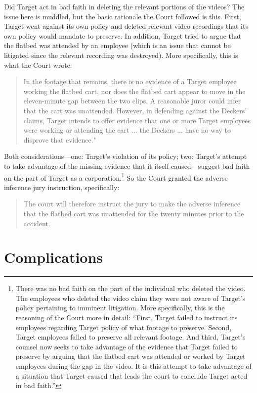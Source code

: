 \documentclass[
  10pt,
  dvipsnames,enabledeprecatedfontcommands]{scrartcl}
\begin{document}
Did Target act in bad faith in deleting the relevant portions of the
videos? The issue here is muddled, but the basic rationale the Court
followed is this. First, Target went against its own policy and deleted
relevant video recordings that its own policy would mandate to preserve.
In addition, Target tried to argue that the flatbed was attended by an
employee (which is an issue that cannot be litigated since the relevant
recording was destroyed). More specifically, this is what the Court
wrote:

\begin{quote}
In the footage that remains, there is no evidence of a Target employee working the flatbed cart, nor does the flatbed cart appear to move in the eleven-minute gap between the two clips. A reasonable juror could infer that the cart was unattended. However, in defending against the Deckers’ claims, Target intends to offer evidence that one or more Target employees were working or attending the cart ... the Deckers ... have no way to disprove that evidence."
\end{quote}

\noindent Both considerations---one: Target's violation of its policy;
two: Target's attempt to take advantage of the missing evidence that it
itself caused---suggest bad faith on the part of Target as a
corporation.\footnote{There was no bad faith on the part of the
  individual who deleted the video. The employees who deleted the video
  claim they were not aware of Target's policy pertaining to imminent
  litigation. More specifically, this is the reasoning of the Court more
  in detail: ``First, Target failed to instruct its employees regarding
  Target policy of what footage to preserve. Second, Target employees
  failed to preserve all relevant footage. And third, Target's counsel
  now seeks to take advantage of the evidence that Target failed to
  preserve by arguing that the flatbed cart was attended or worked by
  Target employees during the gap in the video. It is this attempt to
  take advantage of a situation that Target caused that leads the court
  to conclude Target acted in bad faith.''} So the Court granted the
adverse inference jury instruction, specifically:

\begin{quote}
The court will therefore instruct the jury to make the adverse inference that the flatbed cart was unattended for the twenty minutes prior to the accident.
\end{quote}

\hypertarget{complications}{%
\section{Complications}\label{complications}}
\end{document}
